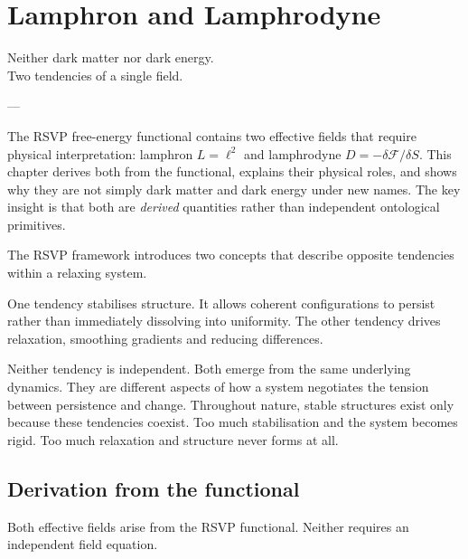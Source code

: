 
\chapter{Lamphron and Lamphrodyne}
\label{ch:lamphron-lamphrodyne}

\epigraph{%
  Neither dark matter nor dark energy.\\
  Two tendencies of a single field.%
}{---}

\begin{WhyChapter}
  The RSVP free-energy functional contains two effective fields
  that require physical interpretation: lamphron $L = \ell^2$
  and lamphrodyne $D = -\delta\mathcal{F}/\delta S$.
  This chapter derives both from the functional, explains
  their physical roles, and shows why they are not simply
  dark matter and dark energy under new names.
  The key insight is that both are \emph{derived} quantities
  rather than independent ontological primitives.
\end{WhyChapter}


\begin{ChapterIntro}
The RSVP framework introduces two concepts that describe opposite tendencies within a relaxing system.

One tendency stabilises structure. It allows coherent configurations to persist rather than immediately dissolving into uniformity. The other tendency drives relaxation, smoothing gradients and reducing differences.

Neither tendency is independent. Both emerge from the same underlying dynamics. They are different aspects of how a system negotiates the tension between persistence and change. Throughout nature, stable structures exist only because these tendencies coexist. Too much stabilisation and the system becomes rigid. Too much relaxation and structure never forms at all.
\end{ChapterIntro}

\section{Derivation from the functional}

\begin{proposition}
  \label{prop:derived-fields}
  \statusproven{}
  Both effective fields arise from the RSVP functional.
  Neither requires an independent field equation.
\end{proposition}

